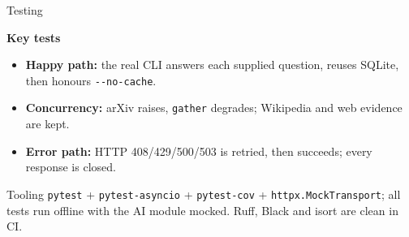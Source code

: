 \documentclass[aspectratio=169,11pt]{beamer}
\newcommand{\owntests}{269}
\newcommand{\smoketests}{16}
\newcommand{\coveragepct}{98.58}
\newcommand{\statTile}[6]{%
  \node[card=#3, minimum width=#2 cm, minimum height=1.6cm, anchor=north west]
    at (#1,0) {};
  \node[anchor=center, text=#3, font=#4\bfseries] at (#1+#2/2,-0.5) {#5};
  \node[anchor=north, text width=\dimexpr#2cm-0.3cm\relax, align=center,
    font=\scriptsize, text=black!70] at (#1+#2/2,-0.92) {#6};
}
\begin{document}
\begin{frame}{Testing}
  \begin{center}
  \end{center}

  \vspace{0.2em}
  \textbf{Key tests}
  \begin{itemize}\small\setlength\itemsep{0.3em}
    \item \textbf{Happy path:} the real CLI answers each supplied question, reuses SQLite,
      then honours \texttt{-{}-no-cache}.
    \item \textbf{Concurrency:} arXiv raises, \texttt{gather} degrades; Wikipedia and web
      evidence are kept.
    \item \textbf{Error path:} HTTP 408/429/500/503 is retried, then succeeds; every response
      is closed.
  \end{itemize}

  \vspace{0.2em}
  \begin{block}{Tooling}
    \small\texttt{pytest} + \texttt{pytest-asyncio} + \texttt{pytest-cov} + \texttt{httpx.MockTransport};
    all tests run offline with the AI module mocked. Ruff, Black and isort are clean in CI.
  \end{block}
\end{frame}
\end{document}
